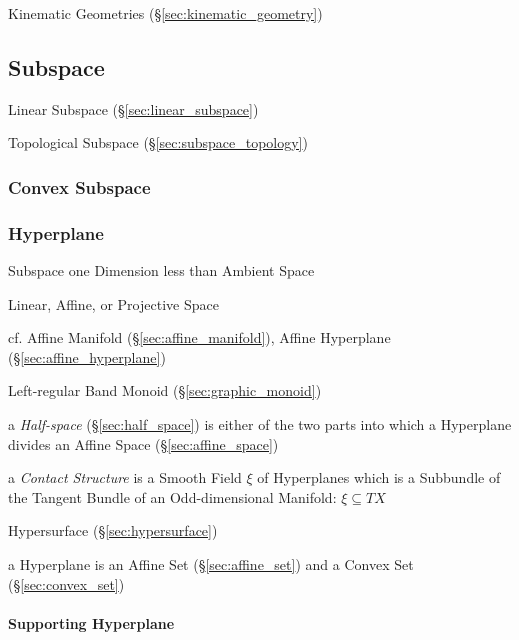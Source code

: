 Kinematic Geometries (\S\ref{sec:kinematic_geometry})



\subsection{Subspace}\label{sec:subspace}


\fist Linear Subspace (\S\ref{sec:linear_subspace})

\fist Topological Subspace (\S\ref{sec:subspace_topology})



\subsubsection{Convex Subspace}\label{sec:convex_subspace}

\subsubsection{Hyperplane}\label{sec:hyperplane}

Subspace one Dimension less than Ambient Space

Linear, Affine, or Projective Space %

cf. Affine Manifold (\S\ref{sec:affine_manifold}), Affine Hyperplane
(\S\ref{sec:affine_hyperplane})

Left-regular Band Monoid (\S\ref{sec:graphic_monoid})

a \emph{Half-space} (\S\ref{sec:half_space}) is either of the two parts into
which a Hyperplane divides an Affine Space (\S\ref{sec:affine_space})

a \emph{Contact Structure} is a Smooth Field $\xi$ of Hyperplanes which is a
Subbundle of the Tangent Bundle of an Odd-dimensional Manifold: $\xi \subseteq
T X$

\fist Hypersurface (\S\ref{sec:hypersurface})

a Hyperplane is an Affine Set (\S\ref{sec:affine_set}) and a Convex Set
(\S\ref{sec:convex_set})



\paragraph{Supporting Hyperplane}\label{sec:supporting_hyperplane}\hfill



